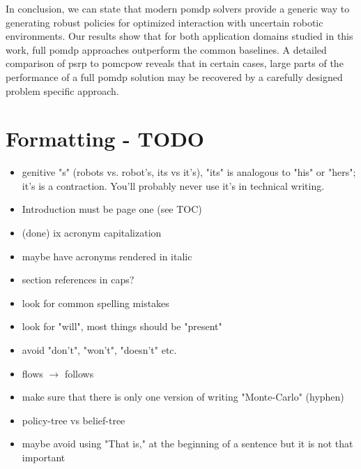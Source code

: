 In conclusion, we can state that modern \ac{pomdp} solvers provide a generic
way to generating robust policies for optimized interaction with uncertain
robotic environments. Our results show that for both application domains
studied in this work, full \ac{pomdp} approaches outperform the common
baselines. A detailed comparison of \ac{psrp} to \ac{pomcpow} reveals that in
certain cases, large parts of the performance of a full \ac{pomdp} solution may
be recovered by a carefully designed problem specific approach.

\chapter{Formatting - TODO}

\begin{itemize}
  \item genitive "s" (robots vs. robot's, its vs it's), "its" is analogous to "his" or "hers"; it's is a contraction. You'll probably never use it's in technical writing.
  \item Introduction must be page one (see TOC)
  \item (done) ix acronym capitalization
  \item maybe have acronyms rendered in italic
  \item section references in caps?
  \item look for common spelling mistakes
  \item look for "will", most things should be "present"
  \item avoid "don't", "won't", "doesn't" etc.\
  \item flows $\to$ follows
  \item make sure that there is only one version of writing "Monte-Carlo" (hyphen)
  \item policy-tree vs belief-tree
  \item maybe avoid using "That is," at the beginning of a sentence but it is not that important
\end{itemize}
